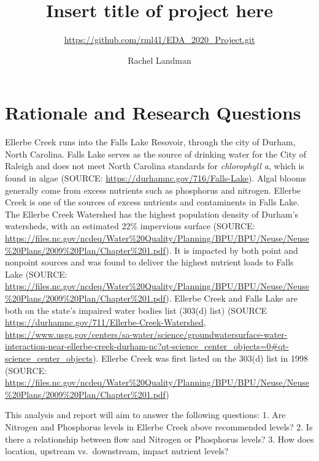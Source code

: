 \documentclass[12pt,]{article}
\title{Insert title of project here}
\subtitle{\url{https://github.com/rml41/EDA_2020_Project.git}}
\author{Rachel Landman}
\date{}
\begin{document}
\maketitle

\newpage
\tableofcontents 
\newpage
\listoftables 
\newpage
\listoffigures 
\newpage

\hypertarget{rationale-and-research-questions}{%
\section{Rationale and Research
Questions}\label{rationale-and-research-questions}}

Ellerbe Creek runs into the Falls Lake Resovoir, through the city of
Durham, North Carolina. Falls Lake serves as the source of drinking
water for the City of Raleigh and does not meet North Carolina standards
for \emph{chlorophyll a}, which is found in algae (SOURCE:
\url{https://durhamnc.gov/716/Falls-Lake}). Algal blooms generally come
from excess nutrients such as phosphorus and nitrogen. Ellerbe Creek is
one of the sources of excess nutrients and contaminents in Falls Lake.
The Ellerbe Creek Watershed has the highest population density of
Durham's watersheds, with an estimated 22\% impervious surface (SOURCE:
\url{https://files.nc.gov/ncdeq/Water\%20Quality/Planning/BPU/BPU/Neuse/Neuse\%20Plans/2009\%20Plan/Chapter\%201.pdf}).
It is impacted by both point and nonpoint sources and was found to
deliver the highest nutrient loads to Falls Lake (SOURCE:
\url{https://files.nc.gov/ncdeq/Water\%20Quality/Planning/BPU/BPU/Neuse/Neuse\%20Plans/2009\%20Plan/Chapter\%201.pdf}).
Ellerbe Creek and Falls Lake are both on the state's impaired water
bodies list (303(d) list) (SOURCE
\url{https://durhamnc.gov/711/Ellerbe-Creek-Watershed},
\url{https://www.usgs.gov/centers/sa-water/science/groundwatersurface-water-interaction-near-ellerbe-creek-durham-nc?qt-science_center_objects=0\#qt-science_center_objects}).
Ellerbe Creek was first listed on the 303(d) list in 1998 (SOURCE:
\url{https://files.nc.gov/ncdeq/Water\%20Quality/Planning/BPU/BPU/Neuse/Neuse\%20Plans/2009\%20Plan/Chapter\%201.pdf})

This analysis and report will aim to answer the following questions: 1.
Are Nitrogen and Phosphorus levels in Ellerbe Creek above recommended
levels? 2. Is there a relationship between flow and Nitrogen or
Phosphorus levels? 3. How does location, upstream vs.~downstream, impact
nutrient levels?

\newpage
\end{document}
